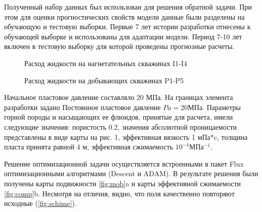 \documentclass{article}
\begin{document}
Полученный набор данных был использован для решения обратной задачи. При этом для оценки прогностических свойств модели данные были разделены на обучающую и тестовую выборки. Первые 7 лет истории разработки отнесены к обучающей выборке и использованы для адаптации модели. Период 7-10 лет включен в тестовую выборку для которой проведены прогнозные расчеты. 

\begin{figure}
	\caption{Расход жидкости на нагнетательных скважинах I1-I4}
	\label{fig:inj_rate}
\end{figure}

\begin{figure}
	\caption{Расход жидкости на добывающих скважинах P1-P5}
	\label{fig:prod_rate}
\end{figure}


 Начальное пластовое давление составляло 20 МПа. На границах элемента разработки задано Постоянное пластовое давление $Pa = 20 МПа$. Параметры горной породы и насыщающих ее флюидов, принятые для расчета, имели следующие значения: пористость 0.2, значения абсолютной проницаемости представлены в виде карты на рис. 1, эффективная вязкость 1 мПа*c, толщина пласта принята равной 4 м, эффективная сжимаемость $10^{-4} МПа^{-1}$.

Решение оптимизационной задачи осуществляется встроенными в пакет Flux оптимизационными алгоритмами (Descent и ADAM). В результате решения были получены карты подвижности \ref{fig:mob}a и карты эффективной сжимаемости \ref{fig:comp}b. Несмотря на отличия, видно, что поля качественно повторяют исходные (\ref{fig:schime}).
\end{document}
